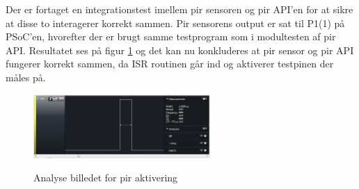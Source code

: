 
Der er fortaget en integrationstest imellem pir sensoren og pir API'en for at sikre at disse to interagerer korrekt sammen. Pir sensorens output er sat til P1(1) på PSoC'en, hvorefter der er brugt samme testprogram som i modultesten af pir API. Resultatet ses på figur \ref{lab:test_maaling1} og det kan nu konkluderes at pir sensor og pir API fungerer korrekt sammen, da ISR routinen går ind og aktiverer testpinen der måles på.

\begin{figure}[H]
\centering
{\includegraphics[width=0.60\textwidth]{filer/modultest/billeder/pir_testmaaling}}
\caption{Analyse billedet for pir aktivering}
\label{lab:test_maaling1}
\end{figure}  
